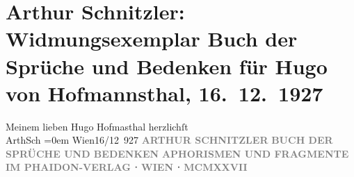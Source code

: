 

         
         \newcommand{\erwaehntePersonen}{Personen: Hugo von Hofmannsthal}
         \newcommand{\erwaehnteInstitutionen}{Institutionen: Phaidon-Verlag}
         \newcommand{\erwaehnteOrte}{Orte: Wien}
         \newcommand{\erwaehnteWerke}{Werke: Buch der Sprüche und Bedenken}
               \section[Arthur Schnitzler: Widmungsexemplar Buch der Sprüche und Bedenken für Hugo von Hofmannsthal, 16. 12. 1927]{ Arthur Schnitzler: Widmungsexemplar Buch der Sprüche und Bedenken für
               Hugo von Hofmannsthal, 16. 12. 1927}\nopagebreak{}\rehead{ }\begin{ledgroupsized}[t]{13cm}\normalsize\beginnumbering \toendnotes[C]{\smallbreak\pagebreak[2]} 
\pstart
           \noindent{}{\pb}Meinem lieben Hugo
                  Hofma{\geminationn}sthal\pend
           \pstart
           herzlichſt{\\[\baselineskip]}\spacefill\mbox{ArthSch}\pend
           \leftskip=0em{}\pstart
           Wien16/12 927\pend
           {\bigskip}\pstart
           \noindent{}\centering{}{\pb}\textcolor{gray}{\textbf{ARTHUR SCHNITZLER}}\pend
           \pstart
           \noindent{}\centering{}\textcolor{gray}{\textbf{BUCH DER SPRÜCHE UND BEDENKEN}}\pend
           \pstart
           \noindent{}\centering{}\textcolor{gray}{\textbf{APHORISMEN UND FRAGMENTE}}\pend
           {\bigskip}\pstart
           \noindent{}\centering{}\textcolor{gray}{\textbf{IM PHAIDON-VERLAG ⋅ WIEN ⋅ MCMXXVII}}\pend
           
         
         \endnumbering{}\end{ledgroupsized}  \newcommand{\dateiname}{L02493}\newcommand{\titel}{Arthur Schnitzler: Widmungsexemplar Buch der Sprüche und Bedenken für Hugo von Hofmannsthal, 16. 12. 1927}\newcommand{\editorInnen}{Martin Anton Müller und Gerd-Hermann Susen}
      